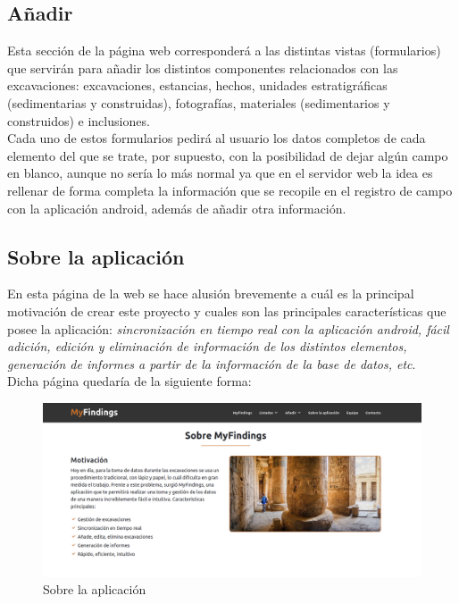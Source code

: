     \subsection{Añadir}
    Esta sección de la página web corresponderá a las distintas vistas (formularios) que
    servirán para añadir los distintos componentes relacionados con las excavaciones:
    excavaciones, estancias, hechos, unidades estratigráficas (sedimentarias y construidas),
    fotografías, materiales (sedimentarios y construidos) e inclusiones.\\

    Cada uno de estos formularios pedirá al usuario los datos completos de cada elemento del
    que se trate, por supuesto, con la posibilidad de dejar algún campo en blanco, aunque
    no sería lo más normal ya que en el servidor web la idea es rellenar de forma completa
    la información que se recopile en el registro de campo con la aplicación android, además
    de añadir otra información.

    \subsection{Sobre la aplicación}
    En esta página de la web se hace alusión brevemente a cuál es la principal motivación
    de crear este proyecto y cuales son las principales características que posee la
    aplicación: \textit{sincronización en tiempo real con la aplicación android, fácil
    adición, edición y eliminación de información de los distintos elementos, generación
    de informes a partir de la información de la base de datos, etc}.\\

    Dicha página quedaría de la siguiente forma:
        
        \begin{figure}[H]
            \centering
            \includegraphics[scale=0.20]{imagenes/about.png}
            \caption{Sobre la aplicación}
            \label{fig:about}
        \end{figure}

